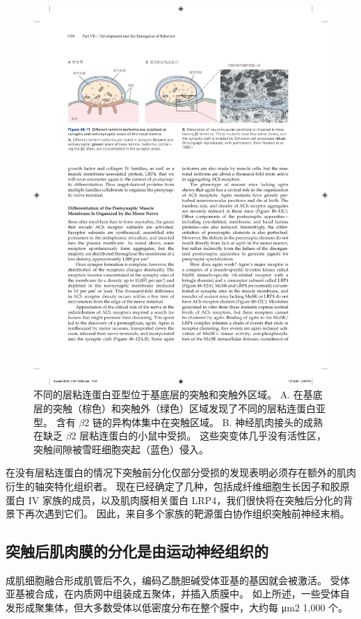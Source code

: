 \begin{figure}[htbp]
	\centering
	\includegraphics[width=0.9\linewidth]{chap48/fig_48_11}
	\caption{不同的层粘连蛋白亚型位于基底层的突触和突触外区域。
		A. 在基底层的突触（棕色）和突触外（绿色）区域发现了不同的层粘连蛋白亚型。
		含有 $\beta$2 链的异构体集中在突触区域。 
		B. 神经肌肉接头的成熟在缺乏 $\beta$2 层粘连蛋白的小鼠中受损。
		这些突变体几乎没有活性区，突触间隙被雪旺细胞突起（蓝色）侵入\cite{noakes1995aberrant}。}
	\label{fig:48_11}
\end{figure}


在没有层粘连蛋白的情况下突触前分化仅部分受损的发现表明必须存在额外的肌肉衍生的轴突特化组织者。
现在已经确定了几种，包括成纤维细胞生长因子和胶原蛋白 IV 家族的成员，以及肌肉膜相关蛋白 LRP4，我们很快将在突触后分化的背景下再次遇到它们。
因此，来自多个家族的靶源蛋白协作组织突触前神经末梢。



\subsection{突触后肌肉膜的分化是由运动神经组织的}

成肌细胞融合形成肌管后不久，编码乙酰胆碱受体亚基的基因就会被激活。
受体亚基被合成，在内质网中组装成五聚体，并插入质膜中。
如上所述，一些受体自发形成聚集体，但大多数受体以低密度分布在整个膜中，大约每 μm2 1,000 个。


